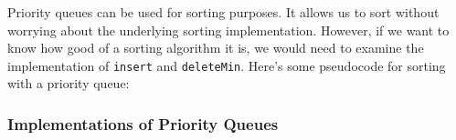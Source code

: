 \documentclass[]{article}
\theoremstyle{definition}
\begin{document}
				Priority queues can be used for sorting purposes. It allows us to sort without worrying about the underlying sorting implementation. However, if we want to know how good of a sorting algorithm it is, we would need to examine the implementation of \verb+insert+ and \verb+deleteMin+. Here's some pseudocode for sorting with a priority queue: \\
				\begin{algorithm}[H]
				\end{algorithm}

			\subsubsection{Implementations of Priority Queues}
\end{document}
